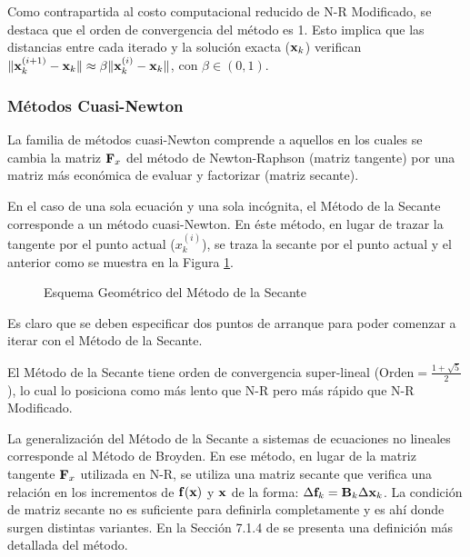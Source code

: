 Como contrapartida al costo computacional reducido de N-R Modificado, se destaca que el orden de convergencia del método es 1. Esto implica que las distancias entre cada iterado y la solución exacta (${\bf x}_k$) verifican $\|{\bf x}_k^{(i+1)}-{\bf x}_k\| \approx \beta \|{\bf x}_k^{(i)}-{\bf x}_k\|$, con $\beta \in (0,1)$.

\subsubsection{Métodos Cuasi-Newton}

La familia de métodos cuasi-Newton comprende a aquellos en los cuales se cambia la matriz ${\bf F}_x$ del método de Newton-Raphson (matriz tangente) por una matriz más económica de evaluar y factorizar (matriz secante).

En el caso de una sola ecuación y una sola incógnita, el Método de la Secante corresponde a un método cuasi-Newton. %
%
En éste método, en lugar de trazar la tangente por el punto actual ($x_k^{(i)}$), se traza la secante por el punto actual y el anterior como se muestra en la Figura \ref{fig:fig3}.
%
\begin{figure}[htb]
	\centering
   \def\svgwidth{0.7\textwidth}

	\caption{Esquema Geométrico del Método de la Secante}
	\label{fig:fig3}
\end{figure}

Es claro que se deben especificar dos puntos de arranque para poder comenzar a iterar con el Método de la Secante.


El Método de la Secante tiene orden de convergencia super-lineal ($\text{Orden}=\frac{1+\sqrt{5}}{2}$), lo cual lo posiciona como más lento que N-R pero más rápido que N-R Modificado.

La generalización del Método de la Secante a sistemas de ecuaciones no lineales corresponde al Método de Broyden. %
%
En ese método, en lugar de la matriz tangente ${\bf F}_x$ utilizada en N-R, se utiliza una matriz secante que verifica una relación en los incrementos de ${\bf f}({\bf x})$ y ${\bf x}$ de la forma: $\Delta {\bf f}_k = {\bf B}_k \Delta {\bf x}_k$. La condición de matriz secante no es suficiente para definirla completamente y es ahí donde surgen distintas variantes. %
%
En la Sección 7.1.4 de \citep{quarteroni2007numeric} se presenta una definición más detallada del método. %

